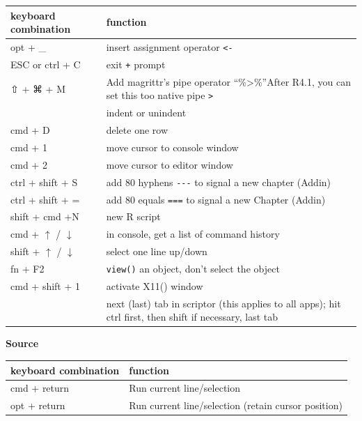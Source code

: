 \documentclass[
  a4paper,
  twoside,
  openright]{book}
\theoremstyle{definition}
\theoremstyle{definition}
\theoremstyle{definition}
\theoremstyle{definition}
\theoremstyle{remark}
\begin{document}
\begin{longtable}[]{@{}
  >{\raggedright\arraybackslash}p{}
  >{\raggedright\arraybackslash}p{}@{}}
\toprule\noalign{}
\begin{minipage}[b]{\linewidth}\raggedright
keyboard combination
\end{minipage} & \begin{minipage}[b]{\linewidth}\raggedright
function
\end{minipage} \\
\midrule\noalign{}
\endhead
\bottomrule\noalign{}
\endlastfoot
opt + \_ & insert assignment operator \texttt{\textless{}-} \\
ESC or ctrl + C & exit \texttt{+} prompt \\
⇧ + ⌘ + M & Add magrittr's pipe operator ``\%\textgreater\%''After R4.1, you can set this too native pipe \texttt{\textbar{}\textgreater{}} \\
{ctrl + \texttt{{[}}/\texttt{{]}}} & indent or unindent \\
cmd + D & delete one row \\
cmd + 1 & move cursor to console window \\
cmd + 2 & move cursor to editor window \\
ctrl + shift + S & add 80 hyphens \texttt{-\/-\/-} to signal a new chapter (Addin) \\
ctrl + shift + = & add 80 equals \texttt{===} to signal a new Chapter (Addin) \\
shift + cmd +N & new R script \\
cmd + \(\uparrow\) / \(\downarrow\) & in console, get a list of command history \\
shift + \(\uparrow\) / \(\downarrow\) & select one line up/down \\
fn + F2 & \texttt{view()} an object, don't select the object \\
cmd + shift + 1 & activate X11() window \\
{ctrl (+ shift) + tab} & next (last) tab in scriptor (this applies to all apps); hit ctrl first, then shift if necessary, last tab \\
\end{longtable}

{\textbf{Source}}

\begin{longtable}[]{@{}
  >{\raggedright\arraybackslash}p{}
  >{\raggedright\arraybackslash}p{}@{}}
\toprule\noalign{}
\begin{minipage}[b]{\linewidth}\raggedright
keyboard combination
\end{minipage} & \begin{minipage}[b]{\linewidth}\raggedright
function
\end{minipage} \\
\midrule\noalign{}
\endhead
\bottomrule\noalign{}
\endlastfoot
cmd + return & Run current line/selection \\
opt + return & Run current line/selection (retain cursor position) \\
\end{longtable}
\end{document}
